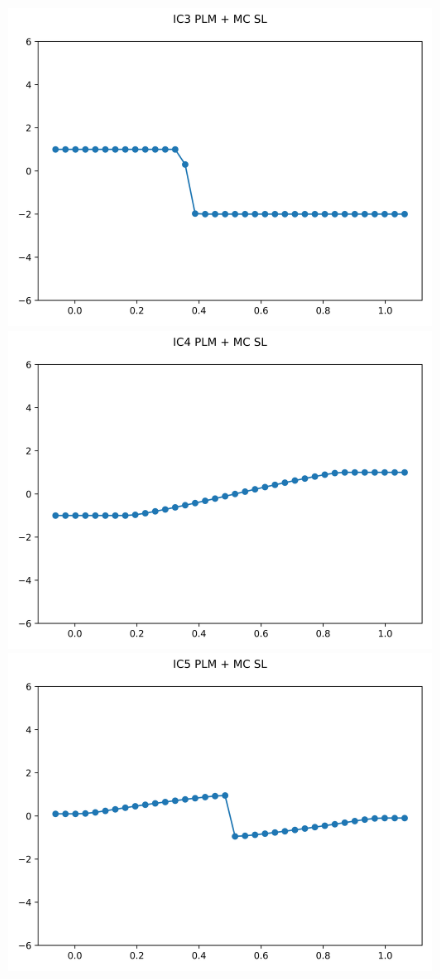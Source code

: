 \documentclass{article}
\begin{document}
\begin{figure}[t]
        \includegraphics[width=.95\textwidth]{../../code/IC3Methodpo_plot.png}
        \includegraphics[width=.95\textwidth]{../../code/IC4Methodpo_plot.png}
        \includegraphics[width=.95\textwidth]{../../code/IC5Methodpo_plot.png}

\end{figure}
\end{document}
